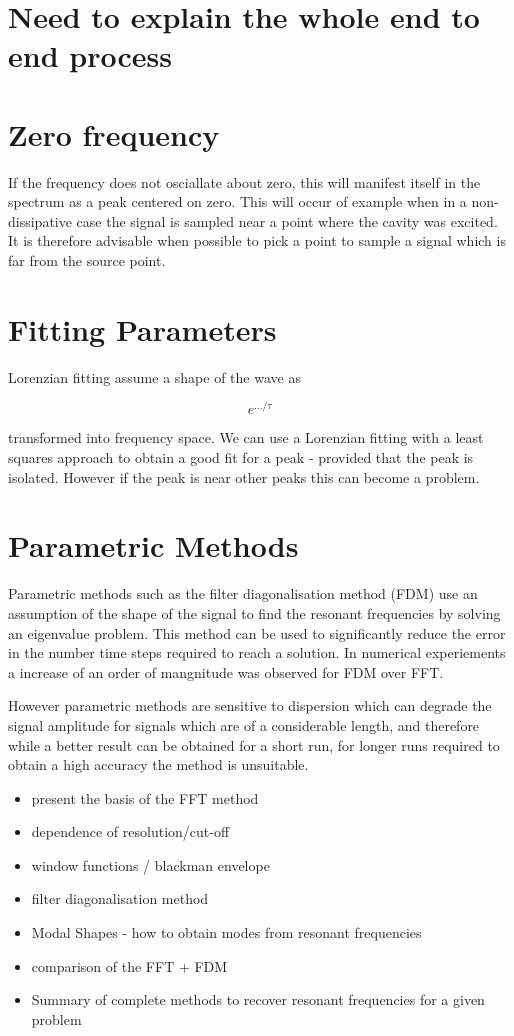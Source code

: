 \section{Need to explain the whole end to end process}

\section{Zero frequency}
If the frequency does not osciallate about zero, this will manifest itself in the spectrum as a peak centered on zero. This will occur of example when in a non-dissipative case the signal is sampled near a point where the cavity was excited. It is therefore advisable when possible to pick a point to sample a signal which is far from the source point.

\section{Fitting Parameters}

Lorenzian fitting assume a shape of the wave as

$$
e^{.../\tau}
$$

transformed into frequency space. We can use a Lorenzian fitting with a least squares approach to obtain a good fit for a peak - provided that the peak is isolated. However if the peak is near other peaks this can become a problem.


\section{Parametric Methods}

Parametric methods such as the filter diagonalisation method (FDM) use an assumption of the shape of the signal to find the resonant frequencies by solving an eigenvalue problem. This method can be used to significantly reduce the error in the number time steps required to reach a solution. In numerical experiements a increase of an order of mangnitude was observed for FDM over FFT.

However parametric methods are sensitive to dispersion which can degrade the signal amplitude for signals which are of a considerable length, and therefore while a better result can be obtained for a short run, for longer runs required to obtain a high accuracy the method is unsuitable.

\begin{itemize}
  \item present the basis of the FFT method
  \item dependence of resolution/cut-off
	\item window functions / blackman envelope
	\item filter diagonalisation method
	\item Modal Shapes - how to obtain modes from resonant frequencies
  \item comparison of the FFT + FDM
  \item Summary of complete methods to recover resonant frequencies for a given problem
\end{itemize}

